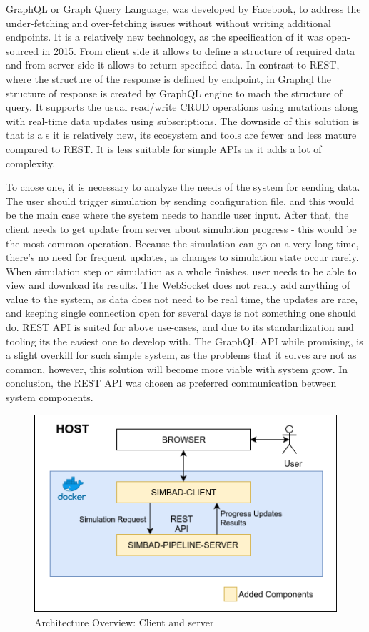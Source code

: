 GraphQL or Graph Query Language, was developed by Facebook, to address the under-fetching and over-fetching issues without without writing additional endpoints.  It is a relatively new technology, as the specification of it was open-sourced in 2015. From client side it allows to define a structure of required data and from server side it allows to return specified data. In contrast to REST, where the structure of the response is defined by endpoint, in Graphql the structure of response is created by GraphQL engine to mach the structure of query. It supports the usual read/write CRUD operations using mutations along with real-time data updates using subscriptions. The downside of this solution is that is a s it is relatively new, its ecosystem and tools are fewer and less mature compared to REST. It is less suitable for simple APIs as it adds a lot of complexity.

To chose one, it is necessary to analyze the needs of the system for sending data. The user should trigger simulation by sending configuration file, and this would be the main case where the system needs to handle user input. After that, the client needs to get update from server about simulation progress - this would be the most common operation. Because the simulation can go on a very long time, there's no need for frequent updates, as changes to simulation state occur rarely. When simulation step or simulation as a whole finishes, user needs to be able to view and download its results. The WebSocket does not really add anything of value to the system, as data does not need to be real time, the updates are rare, and keeping single connection open for several days is not something one should do.  REST API is suited for above use-cases, and due to its standardization and tooling its the easiest one to develop with. The GraphQL API while promising, is a slight overkill for such simple system, as the problems that it solves are not as common, however, this solution will become more viable with system grow. In conclusion, the REST API was chosen as preferred communication between system components. 
\begin{figure}[h!]
	\centering
		\includegraphics[width=0.9\linewidth]{diagrams/arch2.png}
	\caption{Architecture Overview: Client and server}
	\label{fig:arch2}
\end{figure}
\newpage 
